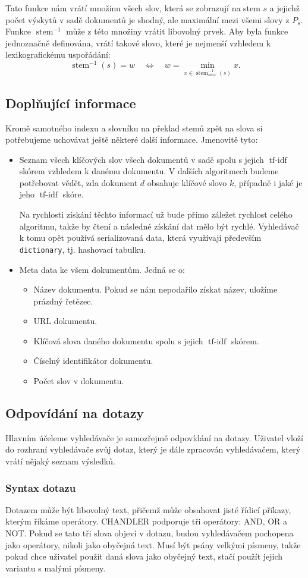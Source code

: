 \documentclass[12pt]{article}
\newcommand{\name}{CHANDLER}
\newcommand{\code}[1]{\texttt{#1}}
\newcommand{\ssection}[1]{\subsection{#1}}
\newcommand{\sssection}[1]{\subsubsection{#1}}
\newcommand{\eq}{\Leftrightarrow}
\DeclareMathOperator{\tfidf}{tf-idf}
\DeclareMathOperator{\stem}{stem}
\newcommand{\invstem}{\stem^{-1}}
\begin{document}
Tato funkce nám vrátí množinu všech slov, která se zobrazují na stem $s$ a jejichž počet výskytů v sadě dokumentů je shodný, ale maximální mezi všemi slovy z $P_s$. Funkce $\invstem$ může z této množiny vrátit libovolný prvek. Aby byla funkce jednoznačně definována, vrátí takové slovo, které je nejmenší vzhledem k lexikografickému uspořádání:
$$\invstem(s)=w\quad\eq\quad w=\min_{x\in \invstem_{max}(s)}x.$$

\ssection{Doplňující informace}
Kromě samotného indexu a slovníku na překlad stemů zpět na slova si potřebujeme uchovávat ještě některé další informace. Jmenovitě tyto: 

\begin{itemize}
\item Seznam všech klíčových slov všech dokumentů v sadě spolu s jejich $\tfidf$ skórem vzhledem k danému dokumentu. V dalších algoritmech budeme potřebovat vědět, zda dokument $d$ obsahuje klíčové slovo $k$, případně i jaké je jeho $\tfidf$ skóre. 

Na rychlosti získání těchto informací už bude přímo záležet rychlost celého algoritmu, takže by čtení a následné získání dat mělo být rychlé. Vyhledávač k tomu opět používá serializovaná data, která využívají především \code{dictionary}, tj. hashovací tabulku. 

\item Meta data ke všem dokumentům. Jedná se o:
	\begin{itemize}
	\item Název dokumentu. Pokud se nám nepodařilo získat název, uložíme prázdný řetězec.
	\item URL dokumentu. 
	\item Klíčová slova daného dokumentu spolu s jejich $\tfidf$ skórem. 
	\item Číselný identifikátor dokumentu.
	\item Počet slov v dokumentu. 
	\end{itemize}
\end{itemize}




\ssection{Odpovídání na dotazy}
Hlavním účeleme vyhledávače je samozřejmě odpovídání na dotazy. Uživatel vloží do rozhraní vyhledávače svůj dotaz, který je dále zpracován vyhledávačem, který vrátí nějaký seznam výsledků. 

\sssection{Syntax dotazu}
Dotazem může být libovolný text, přičemž může obsahovat jisté řídicí příkazy, kterým říkáme operátory. \name{} podporuje tři operátory: AND, OR a NOT. Pokud se tato tři slova objeví v dotazu, budou vyhledávačem pochopena jako operátory, nikoli jako obyčejná text. Musí být psány velkými písmeny, takže pokud chce uživatel použít daná slova jako obyčejný text, stačí použít jejich variantu s malými písmeny. 
\end{document}
